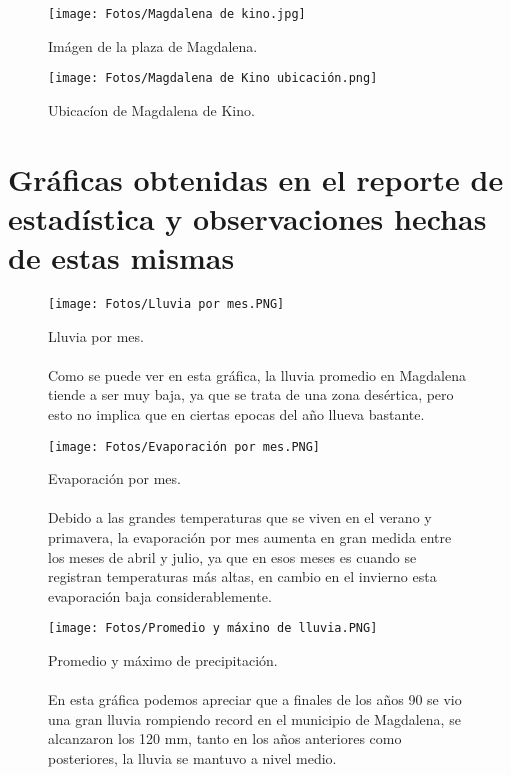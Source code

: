 \documentclass{article}
\begin{document}
\begin{figure}[H]
    \centering
    \texttt{[image: Fotos/Magdalena de kino.jpg]}
    \caption{Imágen de la plaza de Magdalena.}
\end{figure}

\begin{figure}[H]
    \centering
    \texttt{[image: Fotos/Magdalena de Kino ubicación.png]}
    \caption{Ubicacíon de Magdalena de Kino.}
\end{figure}

\section{Gráficas obtenidas en el reporte de estadística y observaciones hechas de estas mismas}

\begin{figure}[H]
    \centering
    \texttt{[image: Fotos/Lluvia por mes.PNG]}
    \caption{Lluvia por mes. \\
    \\
    Como se puede ver en esta gráfica, la lluvia promedio en Magdalena tiende a ser muy baja, ya que se trata de una zona desértica, pero esto no implica que en ciertas epocas del año llueva bastante.}
\end{figure}

\begin{figure}[H]
    \centering
    \texttt{[image: Fotos/Evaporación por mes.PNG]}
    \caption{Evaporación por mes. \\
    \\
    Debido a las grandes temperaturas que se viven en el verano y primavera, la evaporación por mes aumenta en gran medida entre los meses de abril y julio, ya que en esos meses es cuando se registran temperaturas más altas, en cambio en el invierno esta evaporación baja considerablemente.}
\end{figure}

\begin{figure}[H]
    \centering
    \texttt{[image: Fotos/Promedio y máxino de lluvia.PNG]}
    \caption{Promedio y máximo de precipitación.\\
    \\
    En esta gráfica podemos apreciar que a finales de los años 90 se vio una gran lluvia rompiendo record en el municipio de Magdalena, se alcanzaron los 120 mm, tanto en los años anteriores como posteriores, la lluvia se mantuvo a nivel medio.}
\end{figure}
\end{document}
